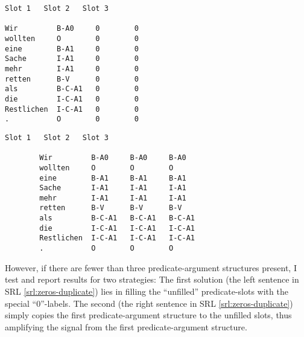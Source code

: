 \begingroup
\begin{srl}[!h]
  \begin{minipage}{0.45\linewidth}
  \vspace{0pt}
    \begin{BVerbatim}[commandchars=\\\{\}, fontsize=\footnotesize]
            Slot 1   Slot 2   Slot 3

Wir         B-A0     0        0
wollten     O        0        0
eine        B-A1     0        0
Sache       I-A1     0        0
mehr        I-A1     0        0
retten      B-V      0        0
als         B-C-A1   0        0
die         I-C-A1   0        0
Restlichen  I-C-A1   0        0
.           O        0        0
      \end{BVerbatim}
  \end{minipage}
  \begin{minipage}{0.45\linewidth}
  \vspace{0pt}
    \begin{BVerbatim}[commandchars=\\\{\}, fontsize=\footnotesize]
                    Slot 1   Slot 2   Slot 3

        Wir         B-A0     B-A0     B-A0
        wollten     O        O        O
        eine        B-A1     B-A1     B-A1
        Sache       I-A1     I-A1     I-A1
        mehr        I-A1     I-A1     I-A1
        retten      B-V      B-V      B-V
        als         B-C-A1   B-C-A1   B-C-A1
        die         I-C-A1   I-C-A1   I-C-A1
        Restlichen  I-C-A1   I-C-A1   I-C-A1
        .           O        O        O
    \end{BVerbatim}
  \end{minipage}
\end{srl}
\label{srl:zeros-duplicate}
\endgroup


However, if there are fewer than three predicate-argument structures
present, I test and report results for two strategies: The first solution (the left sentence
in SRL \ref{srl:zeros-duplicate}) lies in filling the ``unfilled'' predicate-slots with the
special ``0''-labels. The second (the right sentence in SRL \ref{srl:zeros-duplicate}) simply
copies the first predicate-argument structure to the unfilled slots, thus amplifying the signal
from the first predicate-argument structure.

